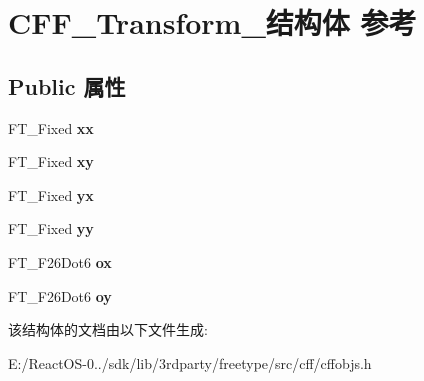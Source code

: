 \hypertarget{struct_c_f_f___transform__}{}\section{C\+F\+F\+\_\+\+Transform\+\_\+结构体 参考}
\label{struct_c_f_f___transform__}
\subsection*{Public 属性}
\begin{DoxyCompactItemize}
\item 
\mbox{\label{struct_c_f_f___transform___ab298a077bcdb766295e143b75a804d56}} 
F\+T\+\_\+\+Fixed {\bfseries xx}
\item 
\mbox{\label{struct_c_f_f___transform___a416f86bda38e8419c3cc257318428527}} 
F\+T\+\_\+\+Fixed {\bfseries xy}
\item 
\mbox{\label{struct_c_f_f___transform___af31ed561987e0d591fa1b9cc07223c34}} 
F\+T\+\_\+\+Fixed {\bfseries yx}
\item 
\mbox{\label{struct_c_f_f___transform___a43b2ee1db7f2491becdceba5ea83d396}} 
F\+T\+\_\+\+Fixed {\bfseries yy}
\item 
\mbox{\label{struct_c_f_f___transform___ac818ee3d460b871aff4224eea40b7144}} 
F\+T\+\_\+\+F26\+Dot6 {\bfseries ox}
\item 
\mbox{\label{struct_c_f_f___transform___a5600d25e4fc3bb6385f0d67a15ac41cd}} 
F\+T\+\_\+\+F26\+Dot6 {\bfseries oy}
\end{DoxyCompactItemize}


该结构体的文档由以下文件生成\+:\begin{DoxyCompactItemize}
\item 
E\+:/\+React\+O\+S-\/0../sdk/lib/3rdparty/freetype/src/cff/cffobjs.\+h\end{DoxyCompactItemize}
